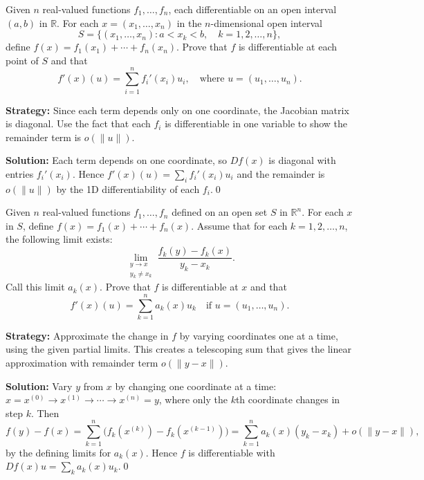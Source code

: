 \begin{problembox}
\begin{problemstatement}
Given \( n \) real-valued functions \( f_1, \ldots, f_n \), each differentiable on an open interval \( (a, b) \) in \( \mathbb{R} \). For each \( x = (x_1, \ldots, x_n) \) in the \( n \)-dimensional open interval
\[S = \{(x_1, \ldots, x_n): a < x_k < b, \quad k = 1, 2, \ldots, n\},\]
define \( f(x) = f_1(x_1) + \cdots + f_n(x_n) \). Prove that \( f \) is differentiable at each point of \( S \) and that
\[f'(x)(u) = \sum_{i=1}^{n} f_i'(x_i)u_i, \quad \text{where } u = (u_1, \ldots, u_n).\]
\end{problemstatement}
\end{problembox}

\noindent\textbf{Strategy:} Since each term depends only on one coordinate, the Jacobian matrix is diagonal. Use the fact that each \( f_i \) is differentiable in one variable to show the remainder term is \( o(\|u\|) \).

\bigskip\noindent\textbf{Solution:}
Each term depends on one coordinate, so $Df(x)$ is diagonal with entries $f_i'(x_i)$. Hence $f'(x)(u)=\sum_i f_i'(x_i)u_i$ and the remainder is $o(\|u\|)$ by the 1D differentiability of each $f_i$.\qed


\begin{problembox}
\begin{problemstatement}
Given \( n \) real-valued functions \( f_1, \ldots, f_n \) defined on an open set \( S \) in \( \mathbb{R}^n \). For each \( x \) in \( S \), define \( f(x) = f_1(x) + \cdots + f_n(x) \). Assume that for each \( k = 1, 2, \ldots, n \), the following limit exists:
\[\lim_{\substack{y \to x \\ y_k \neq x_k}} \frac{f_k(y) - f_k(x)}{y_k - x_k}.\]
Call this limit \( a_k(x) \). Prove that \( f \) is differentiable at \( x \) and that
\[f'(x)(u) = \sum_{k=1}^{n} a_k(x) u_k \quad \text{if } u = (u_1, \ldots, u_n).\]
\end{problemstatement}
\end{problembox}

\noindent\textbf{Strategy:} Approximate the change in \( f \) by varying coordinates one at a time, using the given partial limits. This creates a telescoping sum that gives the linear approximation with remainder term \( o(\|y-x\|) \).

\bigskip\noindent\textbf{Solution:}
Vary $y$ from $x$ by changing one coordinate at a time: $x=x^{(0)}\to x^{(1)}\to\cdots\to x^{(n)}=y$, where only the $k$th coordinate changes in step $k$. Then
\[f(y)-f(x)=\sum_{k=1}^n\big(f_k(x^{(k)})-f_k(x^{(k-1)})\big)=\sum_{k=1}^n a_k(x)(y_k-x_k)+o(\|y-x\|),\]
by the defining limits for $a_k(x)$. Hence $f$ is differentiable with $Df(x)u=\sum_k a_k(x)u_k$.\qed


